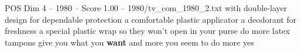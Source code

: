 \begin{textsample}{POS Dim 4 – 1980 – Score 1.00 – 1980/tv\_com\_1980\_2.txt}  \label{ex:f4_pos_063}
with double-layer design for dependable protection a comfortable plastic applicator a deodorant for freshness a special plastic wrap so they won't open in your purse do more latex tampons give you what you \textbf{want} and more you seem to do more yes

\end{textsample}
